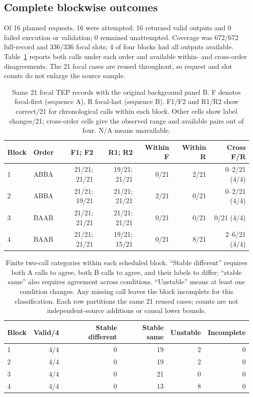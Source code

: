\documentclass[11pt,a4paper]{article}
\begin{document}
\subsection{Complete blockwise outcomes}
Of 16 planned requests, 16 were attempted: 16 returned valid outputs and 0 failed execution or validation; 0 remained unattempted. Coverage was 672/672 full-record and 336/336 focal slots; 4 of four blocks had all outputs available. Table~\ref{tab:context_blocked_outcomes} reports both calls under each order and available within- and cross-order disagreements. The 21 focal cases are reused throughout, so request and slot counts do not enlarge the source sample.

\begin{table}[htbp]\centering\small
\caption{Same 21 focal TEP records with the original background panel B. F denotes focal-first (sequence A), R focal-last (sequence B). F1/F2 and R1/R2 show correct/21 for chronological calls within each block. Other cells show label changes/21; cross-order cells give the observed range and available pairs out of four. N/A means unavailable.}
\label{tab:context_blocked_outcomes}
\begin{tabular}{@{}llrrrrr@{}}\toprule
Block & Order & F1; F2 & R1; R2 & Within F & Within R & Cross F/R \\\midrule
1 & ABBA & 21/21; 21/21 & 19/21; 21/21 & 0/21 & 2/21 & 0--2/21 (4/4) \\
2 & ABBA & 21/21; 19/21 & 21/21; 21/21 & 2/21 & 0/21 & 0--2/21 (4/4) \\
3 & BAAB & 21/21; 21/21 & 21/21; 21/21 & 0/21 & 0/21 & 0/21 (4/4) \\
4 & BAAB & 21/21; 21/21 & 19/21; 15/21 & 0/21 & 8/21 & 2--6/21 (4/4) \\
\bottomrule\end{tabular}\end{table}

\begin{table}[htbp]\centering\small
\caption{Finite two-call categories within each scheduled block. ``Stable different'' requires both A calls to agree, both B calls to agree, and their labels to differ; ``stable same'' also requires agreement across conditions. ``Unstable'' means at least one condition changes. Any missing call leaves the block incomplete for this classification. Each row partitions the same 21 reused cases; counts are not independent-source additions or causal lower bounds.}
\label{tab:context_blocked_stability}
\begin{tabular}{@{}lrrrrr@{}}\toprule
Block & Valid/4 & Stable different & Stable same & Unstable & Incomplete \\\midrule
1 & 4/4 & 0 & 19 & 2 & 0 \\
2 & 4/4 & 0 & 19 & 2 & 0 \\
3 & 4/4 & 0 & 21 & 0 & 0 \\
4 & 4/4 & 0 & 13 & 8 & 0 \\
\bottomrule\end{tabular}\end{table}
\end{document}
